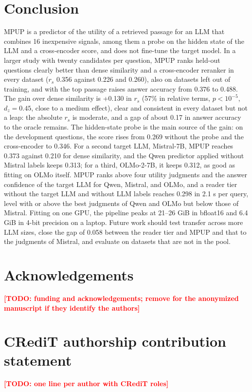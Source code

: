 \documentclass[preprint,12pt,authoryear]{elsarticle}
\newcommand{\TODO}[1]{\textbf{\textcolor{red}{[TODO: #1]}}}
\begin{document}
\section{Conclusion}\label{sec:conclusion}
MPUP is a predictor of the utility of a retrieved passage for an LLM that combines 16 inexpensive signals, among them a probe on the hidden state of the LLM and a cross-encoder score, and does not fine-tune the target model. In a larger study with twenty candidates per question, MPUP ranks held-out questions clearly better than dense similarity and a cross-encoder reranker in every dataset ($r_s$ 0.356 against 0.226 and 0.260), also on datasets left out of training, and with the top passage raises answer accuracy from 0.376 to 0.488. The gain over dense similarity is +0.130 in $r_s$ (57\% in relative terms, $p < 10^{-5}$, $d_z = 0.45$, close to a medium effect), clear and consistent in every dataset but not a leap: the absolute $r_s$ is moderate, and a gap of about 0.17 in answer accuracy to the oracle remains. The hidden-state probe is the main source of the gain: on the development questions, the score rises from 0.269 without the probe and the cross-encoder to 0.346. For a second target LLM, Mistral-7B, MPUP reaches 0.373 against 0.210 for dense similarity, and the Qwen predictor applied without Mistral labels keeps 0.313; for a third, OLMo-2-7B, it keeps 0.312, as good as fitting on OLMo itself. MPUP ranks above four utility judgments and the answer confidence of the target LLM for Qwen, Mistral, and OLMo, and a reader tier without the target LLM and without LLM labels reaches 0.298 in 2.1 s per query, level with or above the best judgments of Qwen and OLMo but below those of Mistral. Fitting on one GPU, the pipeline peaks at 21--26 GiB in bfloat16 and 6.4 GiB in 4-bit precision on a laptop. Future work should test transfer across more LLM sizes, close the gap of 0.058 between the reader tier and MPUP and that to the judgments of Mistral, and evaluate on datasets that are not in the pool.

\section*{Acknowledgements}
\TODO{funding and acknowledgements; remove for the anonymized manuscript if they identify the authors}

\section*{CRediT authorship contribution statement}
\TODO{one line per author with CRediT roles}
\end{document}
